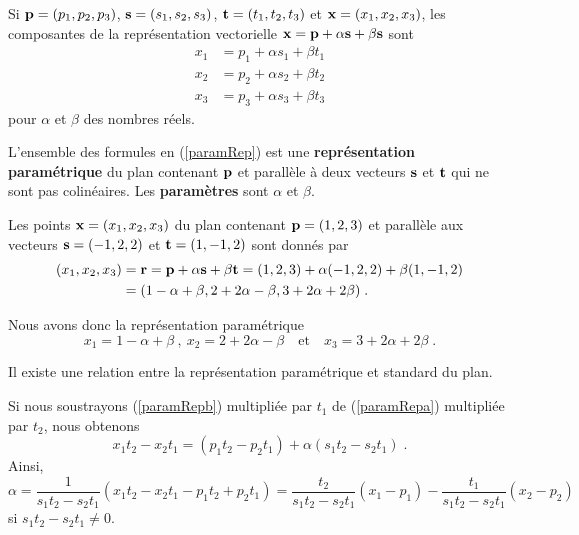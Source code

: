 {Si $\mathbf{p}=(p_1,p_2,p_3)$, $\mathbf{s} = (s_1,s_2,s_3)$,
$\mathbf{t}=(t_1,t_2,t_3)$ et $\mathbf{x}=(x_1,x_2,x_3)$, les composantes de la
représentation vectorielle
$\mathbf{x} = \mathbf{p} + \alpha \mathbf{s} + \beta \mathbf{s}$ sont
\begin{subequations} \label{paramRep}
\begin{align}
x_1 &= p_1 + \alpha s_1 + \beta t_1 \label{paramRepa} \\
x_2 &= p_2 + \alpha s_2 + \beta t_2 \label{paramRepb} \\
x_3 &= p_3 + \alpha s_3 + \beta t_3 \label{paramRepc}
\end{align}
\end{subequations}
pour $\alpha$ et $\beta$ des nombres réels.

\begin{defn} 
L'ensemble des formules en (\ref{paramRep}) est une {\bfseries
représentation paramétrique} du plan contenant $\mathbf{p}$ et parallèle
à deux vecteurs $\mathbf{s}$ et $\mathbf{t}$ qui ne sont pas colinéaires.
Les {\bfseries paramètres} sont $\alpha$ et $\beta$.
\end{defn}

\begin{egg}
Les points $\mathbf{x}=(x_1,x_2,x_3)$ du plan contenant $\mathbf{p}=(1,2,3)$ et
parallèle aux vecteurs $\mathbf{s}=(-1,2,2)$ et $\mathbf{t}=(1,-1,2)$ sont
donnés par
\begin{align*}
(x_1,x_2,x_3) &= \mathbf{r} = \mathbf{p} + \alpha \mathbf{s} + \beta \mathbf{t}
= (1,2,3) + \alpha (-1,2,2) + \beta (1,-1,2) \\
&= (1-\alpha +\beta, 2 +2 \alpha - \beta, 3 + 2\alpha +2\beta) \; .
\end{align*}

Nous avons donc la représentation paramétrique
\[
x_1 = 1-\alpha+\beta \ , \ x_2 = 2+2\alpha-\beta \quad \text{et} \quad 
x_3 = 3+2\alpha + 2\beta \; .
\]
\end{egg}

\begin{rmk}[\theory]
Il existe une relation entre la représentation paramétrique et standard du
plan.

Si nous soustrayons (\ref{paramRepb}) multipliée par $t_1$ de
(\ref{paramRepa}) multipliée par $t_2$, nous obtenons
\[
x_1 t_2 - x_2 t_1 = (p_1 t_2 - p_2 t_1) + \alpha (s_1 t_2 - s_2 t_1) \; .
\]
Ainsi,
\[
\alpha = \frac{1}{s_1 t_2 - s_2 t_1}
\left(x_1 t_2 - x_2 t_1 - p_1 t_2 + p_2 t_1\right) = 
\frac{t_2}{s_1 t_2 - s_2 t_1} \left(x_1 - p_1\right)
-\frac{t_1}{s_1 t_2 - s_2 t_1} \left(x_2 - p_2\right)
\]
si $s_1 t_2 - s_2 t_1 \neq 0$.


\end{rmk}}
